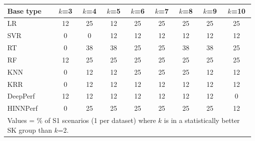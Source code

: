 \begin{tabular}{lcccccccc}
\toprule
Base type & $k$=3 & $k$=4 & $k$=5 & $k$=6 & $k$=7 & $k$=8 & $k$=9 & $k$=10 \\
\midrule
LR & 12 & 25 & 12 & 25 & 25 & 25 & 25 & 25 \\
SVR & 0 & 0 & 12 & 12 & 12 & 12 & 12 & 12 \\
RT & 0 & 38 & 38 & 25 & 25 & 38 & 38 & 25 \\
RF & 12 & 25 & 25 & 25 & 25 & 25 & 25 & 25 \\
KNN & 0 & 12 & 12 & 25 & 25 & 25 & 12 & 12 \\
KRR & 0 & 12 & 12 & 12 & 12 & 12 & 12 & 12 \\
DeepPerf & 12 & 12 & 12 & 12 & 12 & 12 & 12 & 0 \\
HINNPerf & 0 & 25 & 25 & 25 & 25 & 25 & 25 & 12 \\
\bottomrule
\multicolumn{9}{l}{\footnotesize Values = \% of S1 scenarios (1 per dataset) where $k$ is in a statistically better SK group than $k$=2.}} \\
\end{tabular}
